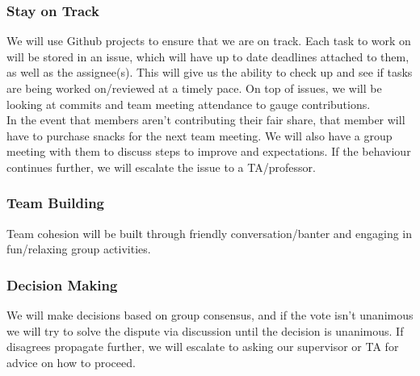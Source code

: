 \documentclass{article}
\begin{document}
\subsubsection*{Stay on Track}

We will use Github projects to ensure that we are on track. Each task to work on
will be stored in an issue, which will have up to date deadlines attached to them, 
as well as the assignee(s). This will give us the ability to check up and see if 
tasks are being worked on/reviewed at a timely pace. On top of issues, we will 
be looking at commits and team meeting attendance to gauge contributions.\\

In the event that members aren't contributing their fair share, that member will have
to purchase snacks for the next team meeting. We will also have a group meeting with 
them to discuss steps to improve and expectations. If the behaviour continues further, 
we will escalate the issue to a TA/professor.

\subsubsection*{Team Building}

Team cohesion will be built through friendly conversation/banter and engaging
in fun/relaxing group activities.

\subsubsection*{Decision Making} 

We will make decisions based on group consensus, and if the vote isn't unanimous we will try to solve the dispute
via discussion until the decision is unanimous. If disagrees propagate further, we will escalate to asking our supervisor
or TA for advice on how to proceed.
\end{document}
